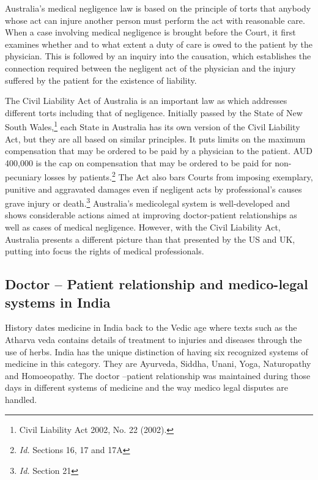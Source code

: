 \begin{multicols}{2}
\noi
Australia’s medical negligence law is based on the principle of torts that anybody whose
act can injure another person must perform the act with reasonable care. When a case
involving medical negligence is brought before the Court, it first examines whether and
to what extent a duty of care is owed to the patient by the physician. This is followed by
an inquiry into the causation, which establishes the connection required between the negligent act of the physician and the injury suffered by the patient for the existence of liability.

\noi
The Civil Liability Act of Australia is an important law as which addresses different torts including that of negligence. Initially passed by the State of New South Wales,\footnote{Civil Liability Act 2002, No. 22 (2002).} each State in Australia has its own version of the Civil Liability Act, but they are all based on similar principles. It puts limits on the maximum compensation that may be ordered to be paid by a physician to the patient. AUD 400,000 is the cap on compensation that may be ordered to be paid for non-pecuniary losses by patients.\footnote{\textit{Id.} Sections 16, 17 and 17A} The Act also bars Courts from imposing exemplary, punitive and aggravated damages even if negligent acts by professional’s causes grave injury or death.\footnote{\textit{Id.} Section 21} Australia’s medicolegal system is well-developed and shows considerable actions aimed at improving doctor-patient relationships as well as cases of medical negligence. However, with the Civil Liability Act, Australia presents a different picture than that presented by the US and UK, putting into focus the rights of medical professionals.

\vspace{-.3cm}

\subsection*{Doctor – Patient relationship and medico-legal systems in India}

\vspace{-.2cm}

\noi
History dates medicine in India back to the Vedic age where texts such as the Atharva
veda contains details of treatment to injuries and diseases through the use of herbs. India
has the unique distinction of having six recognized systems of medicine in this category.
They are Ayurveda, Siddha, Unani, Yoga, Naturopathy and Homoeopathy. The doctor
–patient relationship was maintained during those days in different systems of medicine
and the way medico legal disputes are handled.


\end{multicols}
